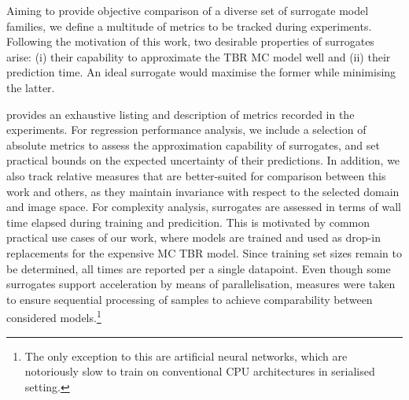 Aiming to provide objective comparison of a diverse set of surrogate model
families, we define a multitude of metrics to be tracked during experiments.
Following the motivation of this work, two desirable properties of surrogates
arise: (i) their capability to approximate the TBR MC model well and (ii) their
prediction time. An ideal surrogate would maximise
the former while minimising the latter.

 provides an exhaustive listing and description of metrics recorded
in the experiments. For regression performance analysis, we include a selection
of absolute metrics to assess the approximation capability of surrogates, and set
practical bounds on the expected uncertainty of their predictions. In addition, we also track
relative measures that are better-suited for comparison between this work and others, as
they maintain invariance with respect to the selected domain and image space.
For complexity analysis, surrogates are assessed in terms of wall time
elapsed during training and predicition. This is motivated by common practical use
cases of our work, where models are trained and used as drop-in replacements for the
expensive MC TBR model. Since training set sizes remain to be determined, all times are
reported per a single datapoint. Even though some surrogates support acceleration
by means of parallelisation, measures were taken to ensure sequential
processing of samples to achieve comparability between considered
models.\footnote{The only exception to this are artificial neural networks, which are
notoriously slow to train on conventional CPU architectures in serialised
setting.}

